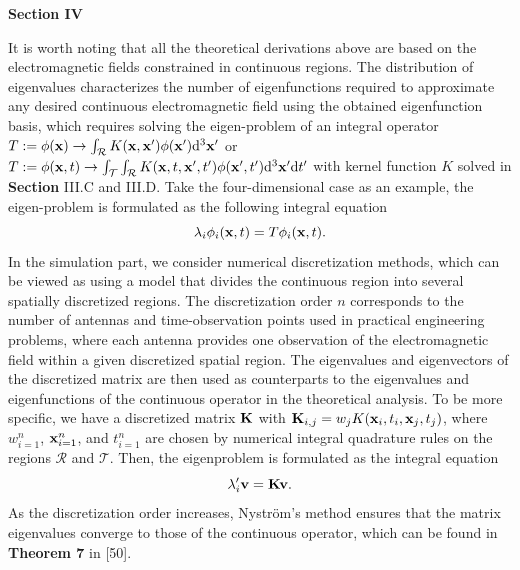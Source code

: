 \documentclass[a4paper,12pt]{article}
\begin{document}
\begin{framed}
	{\bf Section IV}
	
	\setcounter{equation}{62}
	
{\color{red}
	\quad It is worth noting that all the theoretical derivations above are based on the electromagnetic fields constrained in continuous regions. The distribution of eigenvalues characterizes the number of eigenfunctions required to approximate any desired continuous electromagnetic field using the obtained eigenfunction basis, which requires solving the eigen-problem of an integral operator $T := \phi({\bf x}) \rightarrow \int_{\mathcal{R}} K({\bf x},{\bf x}')\phi({\bf x}') {\rm d}^3 {\bf x}'$ or $T := \phi({\bf x},t) \rightarrow \int_{\mathcal{T}}\int_{\mathcal{R}} K({\bf x},t,{\bf x}',t')\phi({\bf x}',t') {\rm d}^3 {\bf x}'{\rm d} {t}'$ with kernel function $K$ solved in {\bf Section} III.C and III.D. Take the four-dimensional case as an example, the eigen-problem is formulated as the following integral equation
	\begin{equation}
		\lambda_i \phi_i({\bf x},t) = T \phi_i({\bf x},t).
	\end{equation}
	In the simulation part, we consider numerical discretization methods, which can be viewed as using a model that divides the continuous region into several spatially discretized regions. The discretization order $n$ corresponds to the number of antennas and time-observation points used in practical engineering problems, where each antenna provides one observation of the electromagnetic field within a given discretized spatial region. The eigenvalues and eigenvectors of the discretized matrix are then used as counterparts to the eigenvalues and eigenfunctions of the continuous operator in the theoretical analysis. To be more specific, we have a discretized matrix ${\bf K}$ with ${\bf K}_{i,j} = w_j K({\bf x}_i,t_i,{\bf x}_j,t_j)$, where ${w}_{i=1}^n$, ${\bf x}_{i=1}^n$, and $t_{i=1}^n$ are chosen by numerical integral quadrature rules on the regions $\mathcal{R}$ and $\mathcal{T}$. Then, the eigenproblem is formulated as the integral equation
	\begin{equation}
		\lambda'_i {\bf v} = {\bf K} {\bf v}.
	\end{equation}
	As the discretization order increases, Nyström’s method ensures that the matrix eigenvalues converge to those of the continuous operator, which can be found in {\bf Theorem 7} in [50]. 
}
	

\end{framed}
\end{document}
